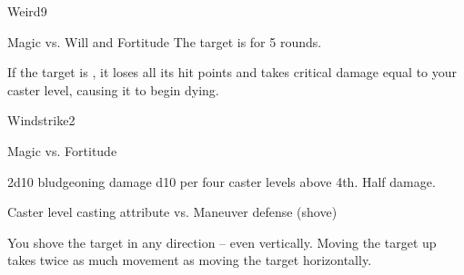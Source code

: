\begin{spellsection}{Weird}{9}
\begin{spellheader}
    \begin{spelltargetinginfo}
    \end{spelltargetinginfo}
\end{spellheader}
\begin{spellcontent}
    \begin{spelleffects}
        \begin{spellattack}{Magic vs. Will and Fortitude}
            \spellsuccess[Will] The target is \shaken for 5 rounds.

             If the target is \bloodied, it loses all its hit points and takes critical damage equal to your caster level, causing it to begin dying.
        \end{spellattack}
    \end{spelleffects}
\end{spellcontent}
\begin{spellfooter}
\end{spellfooter}
\end{spellsection}

\begin{spellsection}{Windstrike}{2}
\begin{spellheader}
    \begin{spelltargetinginfo}
    \end{spelltargetinginfo}
\end{spellheader}
\begin{spellcontent}
    \begin{spelleffects}
        \begin{spellattack}{Magic vs. Fortitude}
            \begin{spellmargin}
                \spellsuccess 2d10 bludgeoning damage \add d10 per four caster levels above 4th.
                \spellfailure Half damage.
            \end{spellmargin}
            \spellatk Caster level \add casting attribute vs. Maneuver defense (shove)
            \begin{spellmargin}
                \spellsuccess You shove the target in any direction -- even vertically. Moving the target up takes twice as much movement as moving the target horizontally.
            \end{spellmargin}
        \end{spellattack}
    \end{spelleffects}
\end{spellcontent}
\begin{spellfooter}
\end{spellfooter}
\end{spellsection}

